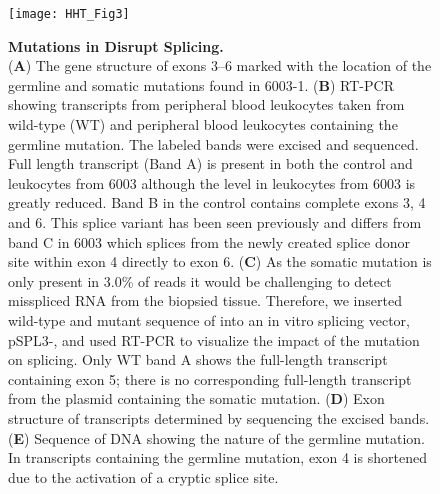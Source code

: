 \begin{figure}[tbp!]
\begin{center}
\texttt{[image: HHT\_Fig3]}
\end{center}

\caption[Mutations in  Disrupt Splicing.]{\textbf{Mutations in  Disrupt Splicing.} \\ (\textbf{A}) The gene structure of  exons 3--6 marked with the location of the germline and somatic mutations found in 6003-1. (\textbf{B}) RT-PCR showing  transcripts from peripheral blood leukocytes taken from wild-type (WT) and peripheral blood leukocytes containing the germline mutation. The labeled bands were excised and sequenced. Full length transcript (Band A) is present in both the control and leukocytes from 6003 although the level in leukocytes from 6003 is greatly reduced.  Band B in the control contains complete exons 3, 4 and 6.  This splice variant has been seen previously and differs from band C in 6003 which splices from the newly created splice donor site within exon 4 directly to exon 6. (\textbf{C}) As the somatic mutation is only present in 3.0\% of reads it would be challenging to detect misspliced RNA from the biopsied tissue. Therefore, we inserted wild-type and mutant sequence of  into an in vitro splicing vector, pSPL3-, and used RT-PCR to visualize the impact of the mutation on splicing. Only WT band A shows the full-length transcript containing exon 5; there is no corresponding full-length transcript from the plasmid containing the somatic mutation. (\textbf{D}) Exon structure of  transcripts determined by sequencing the excised bands. (\textbf{E}) Sequence of DNA showing the nature of the germline mutation. In  transcripts containing the germline mutation, exon 4 is shortened due to the activation of a cryptic splice site. }

\label{HHT_Figure_3}
\end{figure}

